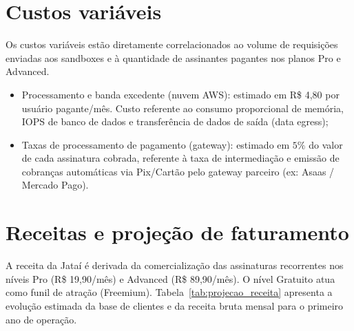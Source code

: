 \documentclass[
  12pt,
  openright,
  oneside,
  a4paper,
  brazilian
]{abntex2}
\begin{document}
\section{Custos variáveis}
\label{sec:custos_variaveis}

Os custos variáveis estão diretamente correlacionados ao volume de requisições enviadas aos sandboxes e à quantidade de assinantes pagantes nos planos Pro e Advanced.

\begin{itemize}
    \item{Processamento e banda excedente (nuvem AWS):} estimado em R\$ 4,80 por usuário pagante/mês. Custo referente ao consumo proporcional de memória, IOPS de banco de dados e transferência de dados de saída (data egress);
    \item{Taxas de processamento de pagamento (gateway):} estimado em $5\%$ do valor de cada assinatura cobrada, referente à taxa de intermediação e emissão de cobranças automáticas via Pix/Cartão pelo gateway parceiro (ex: Asaas / Mercado Pago).
\end{itemize}

\section{Receitas e projeção de faturamento}
\label{sec:receita_estimada}

A receita da Jataí é derivada da comercialização das assinaturas recorrentes nos níveis Pro (R\$ 19,90/mês) e Advanced (R\$ 89,90/mês). O nível Gratuito atua como funil de atração (Freemium). Tabela~\ref{tab:projecao_receita} apresenta a evolução estimada da base de clientes e da receita bruta mensal para o primeiro ano de operação.

\begin{table}[htbp]
\centering
\caption{Projeção de base de clientes e receita bruta mensal (Ano 1).}
\label{tab:projecao_receita}
\end{table}
\end{document}
